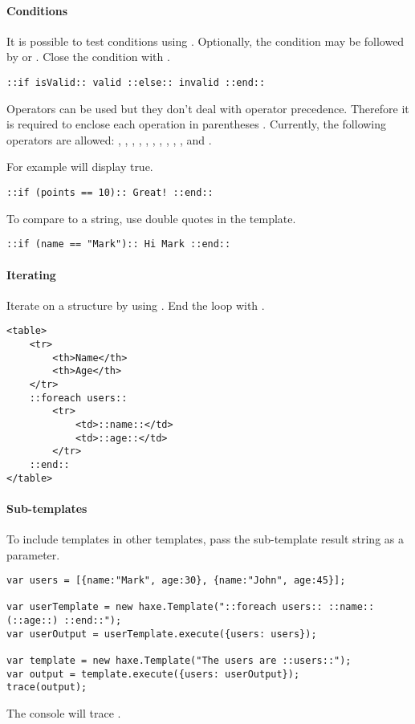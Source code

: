 \paragraph{Conditions}
It is possible to test conditions using . Optionally, the condition may be followed by  or . Close the condition with .

\begin{lstlisting} 
::if isValid:: valid ::else:: invalid ::end::
\end{lstlisting} 

Operators can be used but they don't deal with operator precedence. Therefore it is required to enclose each operation in parentheses \ic{()}. Currently, the following operators are allowed: \ic{+}, \ic{-}, \ic{*}, \ic{/}, \ic{>}, \ic{<},  \ic{>=}, \ic{<=}, \ic{==}, \ic{!=}, \ic{&&} and \ic{||}.

For example  will display true. 

\begin{lstlisting} 
::if (points == 10):: Great! ::end::
\end{lstlisting} 

To compare to a string, use double quotes  in the template.
\begin{lstlisting} 
::if (name == "Mark"):: Hi Mark ::end::
\end{lstlisting} 

\paragraph{Iterating}
Iterate on a structure by using . End the loop with .
\begin{lstlisting} 
<table>
	<tr>
		<th>Name</th>
		<th>Age</th>
	</tr>
	::foreach users::
		<tr>
			<td>::name::</td>
			<td>::age::</td>
		</tr>
	::end::
</table>
\end{lstlisting} 

\paragraph{Sub-templates}
To include templates in other templates, pass the sub-template result string as a parameter.
\begin{lstlisting} 
var users = [{name:"Mark", age:30}, {name:"John", age:45}];

var userTemplate = new haxe.Template("::foreach users:: ::name::(::age::) ::end::");
var userOutput = userTemplate.execute({users: users});

var template = new haxe.Template("The users are ::users::");
var output = template.execute({users: userOutput});
trace(output);
\end{lstlisting} 
The console will trace .

